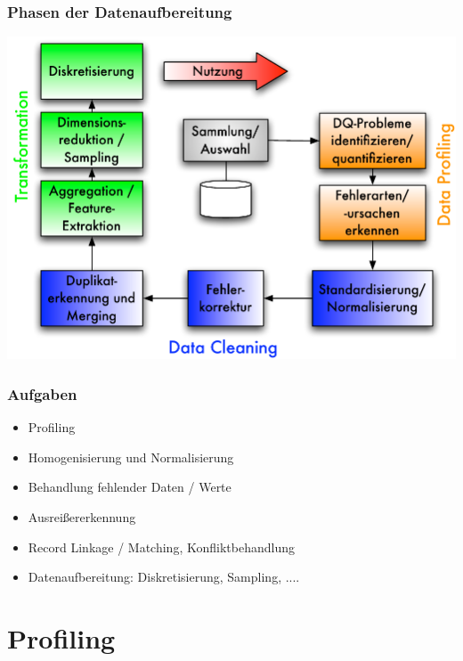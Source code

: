     \begin{frame}
    \frametitle{Phasen der Datenaufbereitung}
    
    \begin{center}
    \includegraphics[scale=.5]{fig4/data-preparation.pdf}
    \end{center}
    
    \end{frame}
    
    
    \begin{frame}
    \frametitle{Aufgaben}
    
    \begin{itemize}
    \item Profiling
    \item Homogenisierung und Normalisierung
    \item Behandlung fehlender Daten / Werte
    \item Ausreißererkennung
    \item Record Linkage / Matching, Konfliktbehandlung
    \item Datenaufbereitung: Diskretisierung, Sampling, .... 
    \end{itemize}
    \end{frame}
    
    
    
    \section{Profiling}
    
